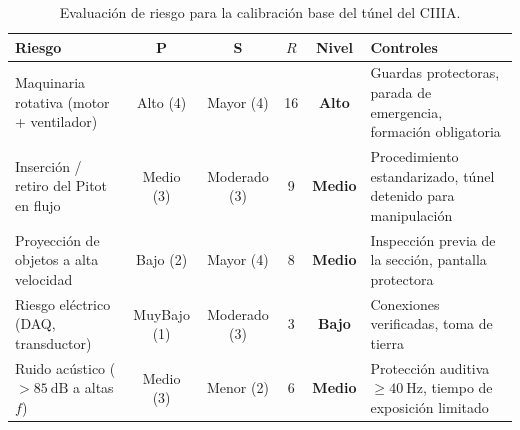 \documentclass[12pt,a4paper]{article}
\begin{document}
\begin{table}[H]
	\centering
	\caption{Evaluación de riesgo para la calibración base del túnel del CIIIA.}
	\label{tab:riesgo_base}
	\small
	\begin{tabularx}{\textwidth}{>{\raggedright\arraybackslash}p{3.2cm} c c c c X}
		\toprule
		\textbf{Riesgo} & \textbf{P}                                                            & \textbf{S}         & \textbf{$R$}
		                & \textbf{Nivel}                                                        & \textbf{Controles}                                                         \\
		\midrule
		\rowcolor{aerored!10}
		Maquinaria rotativa (motor + ventilador)
		                & Alto (4)                                                              & Mayor (4)          & 16           & \textcolor{aerored}{\textbf{Alto}}
		                & Guardas protectoras, parada de emergencia, formación obligatoria                                                                                   \\
		\rowcolor{aeroyellow!20}
		Inserción / retiro del Pitot en flujo
		                & Medio (3)                                                             & Moderado (3)       & 9            & \textcolor{aeroyellow}{\textbf{Medio}}
		                & Procedimiento estandarizado, túnel detenido para manipulación                                                                                      \\
		\rowcolor{aeroyellow!20}
		Proyección de objetos a alta velocidad
		                & Bajo (2)                                                              & Mayor (4)          & 8            & \textcolor{aeroyellow}{\textbf{Medio}}
		                & Inspección previa de la sección, pantalla protectora                                                                                               \\
		\rowcolor{aerogreen!10}
		Riesgo eléctrico (DAQ, transductor)
		                & MuyBajo (1)                                                           & Moderado (3)       & 3            & \textcolor{aerogreen}{\textbf{Bajo}}
		                & Conexiones verificadas, toma de tierra                                                                                                             \\
		\rowcolor{aerogreen!10}
		Ruido acústico ($>\SI{85}{\dB}$ a altas $f$)
		                & Medio (3)                                                             & Menor (2)          & 6            & \textcolor{aeroyellow}{\textbf{Medio}}
		                & Protección auditiva $\geq\SI{40}{\Hz}$, tiempo de exposición limitado                                                                              \\
		\bottomrule
	\end{tabularx}
\end{table}
\end{document}
